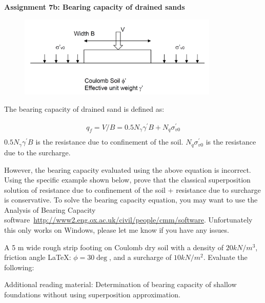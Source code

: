 \documentclass[a4paper,12pt]{article}
\begin{document}
\begin{centering}
	\textbf{
		Assignment 7b: Bearing capacity of drained sands
	}
\end{centering}

\vspace{1em}
\begin{figure}[!h]
	\centering
	\includegraphics[width=0.85\textwidth]{figs/bearing-capacity.png}
\end{figure}
 
The bearing capacity of drained sand is defined as:

\begin{align*}
q_f = V/B = 0.5 N_\gamma \gamma^\prime B + N_q \sigma_{v0}^\prime \\
\end{align*}
$0.5 N_\gamma \gamma^\prime B $ is the resistance due to confinement of the soil. $N_q \sigma_{v0}^\prime$ is the resistance due to the surcharge. 

However, the bearing capacity evaluated using the above equation is incorrect. Using the specific example shown below, prove that the classical superposition solution of resistance due to confinement of the soil + resistance due to surcharge is conservative. To solve the bearing capacity equation, you may want to use the Analysis of Bearing Capacity software~\url{http://www2.eng.ox.ac.uk/civil/people/cmm/software}.  Unfortunately this only works on Windows, please let me know if you have any issues.

A 5 m wide rough strip footing on Coulomb dry soil with a density of $20 kN/m^3$, friction angle LaTeX: $\phi=30\deg$, and a surcharge of $10 kN/m^2$. Evaluate the following: 

Additional reading material: Determination of bearing capacity of shallow foundations without using superposition approximation.
\end{document}
